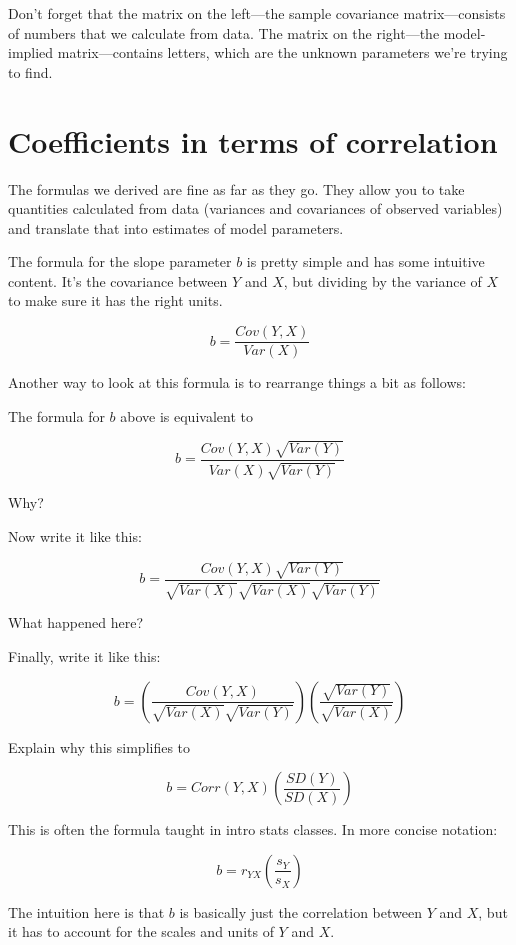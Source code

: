 \documentclass[
]{book}
\begin{document}
Don't forget that the matrix on the left---the sample covariance matrix---consists of numbers that we calculate from data. The matrix on the right---the model-implied matrix---contains letters, which are the unknown parameters we're trying to find.

\hypertarget{simple-coefficients-correlation}{%
\section{Coefficients in terms of correlation}\label{simple-coefficients-correlation}}

The formulas we derived are fine as far as they go. They allow you to take quantities calculated from data (variances and covariances of observed variables) and translate that into estimates of model parameters.

The formula for the slope parameter \(b\) is pretty simple and has some intuitive content. It's the covariance between \(Y\) and \(X\), but dividing by the variance of \(X\) to make sure it has the right units.

\[
b = \frac{Cov(Y, X)}{Var(X)}
\]

Another way to look at this formula is to rearrange things a bit as follows:

The formula for \(b\) above is equivalent to

\[
b = \frac{Cov(Y, X) \sqrt{Var (Y)}}{Var(X)\sqrt{Var(Y)}}
\]

Why?

Now write it like this:

\[
b = \frac{Cov(Y, X) \sqrt{Var (Y)}}{\sqrt{Var(X)}\sqrt{Var(X)}\sqrt{Var(Y)}}
\]

What happened here?

Finally, write it like this:

\[
b = \left(\frac{Cov(Y, X)}{\sqrt{Var(X)} \sqrt{Var(Y)}}\right) \left(\frac{\sqrt{Var(Y)}}{\sqrt{Var(X)}}\right)
\]

Explain why this simplifies to

\[
b = Corr(Y, X)\left(\frac{SD(Y)}{SD(X)}\right)
\]

This is often the formula taught in intro stats classes. In more concise notation:

\[
b = r_{YX}\left(\frac{s_{Y}}{s_{X}}\right)
\]

The intuition here is that \(b\) is basically just the correlation between \(Y\) and \(X\), but it has to account for the scales and units of \(Y\) and \(X\).
\end{document}
